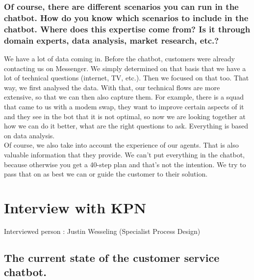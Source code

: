 \begin{appendices}
	\subsubsection{Of course, there are different scenarios you can run in the chatbot. How do you know which scenarios to include in the chatbot. Where does this expertise come from? Is it through domain experts, data analysis, market research, etc.?}
	We have a lot of data coming in. Before the chatbot, customers were already contacting us on Messenger. We simply determined on that basis that we have a lot of technical questions (internet, TV, etc.). Then we focused on that too. That way, we first analysed the data. With that, our technical flows are more extensive, so that we can then also capture them. For example, there is a squad that came to us with a modem swap, they want to improve certain aspects of it and they see in the bot that it is not optimal, so now we are looking together at how we can do it better, what are the right questions to ask. Everything is based on data analysis.\\
	Of course, we also take into account the experience of our agents. That is also valuable information that they provide. We can't put everything in the chatbot, because otherwise you get a 40-step plan and that's not the intention. We try to pass that on as best we can or guide the customer to their solution.
	
	
	\section{Interview with KPN}
	\label{in:KPN}
	Interviewed person : Justin Wesseling (Specialist Process Design)
	\subsection{The current state of the customer service chatbot.}

\end{appendices}
